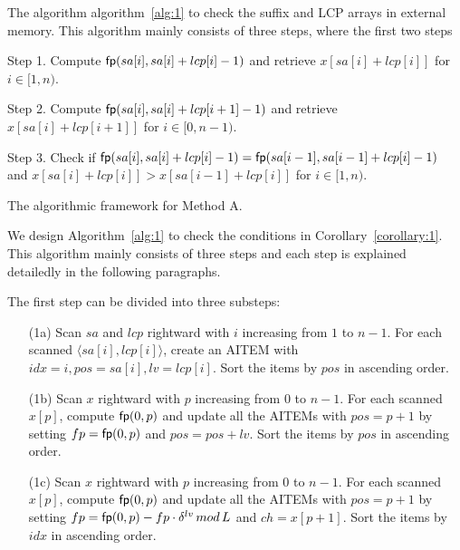 \documentclass[10pt,journal,compsoc]{IEEEtran}
\begin{document}
The algorithm  algorithm~\ref{alg:1} to check the suffix and LCP arrays in external memory. This algorithm mainly consists of three steps, where the first two steps 


\begin{algorithm*}
	
	\SetAlgoNoLine
	
	
	Step 1. Compute ${\sf fp}(sa[i], sa[i] + lcp[i] - 1)$ and retrieve $x[sa[i] + lcp[i]]$ for $i \in [1, n)$.
	
	Step 2. Compute ${\sf fp}(sa[i], sa[i] + lcp[i + 1] - 1)$ and retrieve $x[sa[i] + lcp[i + 1]]$ for $i \in [0, n - 1)$.
	
	Step 3. Check if ${\sf fp}(sa[i], sa[i] + lcp[i] - 1) = {\sf fp}(sa[i - 1], sa[i - 1] + lcp[i] - 1)$ and $x[sa[i] + lcp[i]] > x[sa[i - 1] + lcp[i]]$ for $i \in [1, n)$.
	
	\caption{The algorithmic framework for Method A.}
	
	\label{alg:1}
	
\end{algorithm*}
	
	We design Algorithm~\ref{alg:1} to check the conditions in Corollary~\ref{corollary:1}. This algorithm mainly consists of three steps and each step is explained detailedly in the following paragraphs.
	
	\vspace{1ex}  The first step can be divided into three substeps:
	
	\begin{enumerate}
		
		\item [(1a)]
		Scan $sa$ and $lcp$ rightward with $i$ increasing from $1$ to $n - 1$. For each scanned $\langle sa[i], lcp[i] \rangle$, create an AITEM with $idx = i, pos = sa[i], lv = lcp[i]$. Sort the items by $pos$ in ascending order.
		
		\item [(1b)]
		Scan $x$ rightward with $p$ increasing from $0$ to $n - 1$. For each scanned $x[p]$, compute ${\sf fp}(0, p)$ and update all the AITEMs with $pos = p + 1$ by setting $fp = {\sf fp}(0, p)$ and $pos = pos + lv$. Sort the items by $pos$ in ascending order.
		
		\item [(1c)]
		Scan $x$ rightward with $p$ increasing from $0$ to $n - 1$. For each scanned $x[p]$, compute ${\sf fp}(0, p)$ and update all the AITEMs with $pos = p + 1$ by setting $fp = {\sf fp}(0, p) - fp \cdot {\delta}^{lv} \, mod \, L $ and $ch = x[p + 1]$. Sort the items by $idx$ in ascending order.
		
	\end{enumerate}
	
\end{document}
